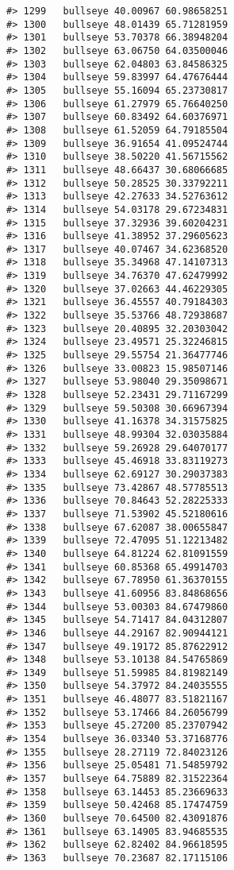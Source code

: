 \documentclass[
]{book}
\theoremstyle{definition}
\theoremstyle{definition}
\theoremstyle{definition}
\theoremstyle{definition}
\theoremstyle{remark}
\begin{document}
\begin{verbatim}
#> 1299   bullseye 40.00967 60.98658251
#> 1300   bullseye 48.01439 65.71281959
#> 1301   bullseye 53.70378 66.38948204
#> 1302   bullseye 63.06750 64.03500046
#> 1303   bullseye 62.04803 63.84586325
#> 1304   bullseye 59.83997 64.47676444
#> 1305   bullseye 55.16094 65.23730817
#> 1306   bullseye 61.27979 65.76640250
#> 1307   bullseye 60.83492 64.60376971
#> 1308   bullseye 61.52059 64.79185504
#> 1309   bullseye 36.91654 41.09524744
#> 1310   bullseye 38.50220 41.56715562
#> 1311   bullseye 48.66437 30.68066685
#> 1312   bullseye 50.28525 30.33792211
#> 1313   bullseye 42.27633 34.52763612
#> 1314   bullseye 54.03178 29.67234831
#> 1315   bullseye 37.32936 39.60204231
#> 1316   bullseye 41.38952 37.29605623
#> 1317   bullseye 40.07467 34.62368520
#> 1318   bullseye 35.34968 47.14107313
#> 1319   bullseye 34.76370 47.62479992
#> 1320   bullseye 37.02663 44.46229305
#> 1321   bullseye 36.45557 40.79184303
#> 1322   bullseye 35.53766 48.72938687
#> 1323   bullseye 20.40895 32.20303042
#> 1324   bullseye 23.49571 25.32246815
#> 1325   bullseye 29.55754 21.36477746
#> 1326   bullseye 33.00823 15.98507146
#> 1327   bullseye 53.98040 29.35098671
#> 1328   bullseye 52.23431 29.71167299
#> 1329   bullseye 59.50308 30.66967394
#> 1330   bullseye 41.16378 34.31575825
#> 1331   bullseye 48.99304 32.03035884
#> 1332   bullseye 59.26928 29.64070177
#> 1333   bullseye 45.46918 33.83119273
#> 1334   bullseye 62.69127 30.29037383
#> 1335   bullseye 73.42867 48.57785513
#> 1336   bullseye 70.84643 52.28225333
#> 1337   bullseye 71.53902 45.52180616
#> 1338   bullseye 67.62087 38.00655847
#> 1339   bullseye 72.47095 51.12213482
#> 1340   bullseye 64.81224 62.81091559
#> 1341   bullseye 60.85368 65.49914703
#> 1342   bullseye 67.78950 61.36370155
#> 1343   bullseye 41.60956 83.84868656
#> 1344   bullseye 53.00303 84.67479860
#> 1345   bullseye 54.71417 84.04312807
#> 1346   bullseye 44.29167 82.90944121
#> 1347   bullseye 49.19172 85.87622912
#> 1348   bullseye 53.10138 84.54765869
#> 1349   bullseye 51.59985 84.81982149
#> 1350   bullseye 54.37972 84.24035555
#> 1351   bullseye 46.48077 83.51821167
#> 1352   bullseye 53.17466 84.26056799
#> 1353   bullseye 45.27200 85.23707942
#> 1354   bullseye 36.03340 53.37168776
#> 1355   bullseye 28.27119 72.84023126
#> 1356   bullseye 25.05481 71.54859792
#> 1357   bullseye 64.75889 82.31522364
#> 1358   bullseye 63.14453 85.23669633
#> 1359   bullseye 50.42468 85.17474759
#> 1360   bullseye 70.64500 82.43091876
#> 1361   bullseye 63.14905 83.94685535
#> 1362   bullseye 62.82402 84.96618595
#> 1363   bullseye 70.23687 82.17115106

\end{verbatim}
\end{document}
